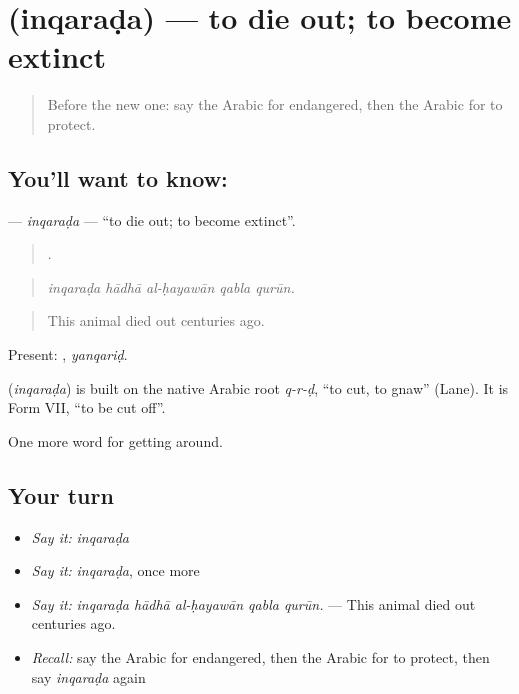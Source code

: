 \section[\texorpdfstring{\ar{انقرض} (inqaraḍa)}{انقرض (inqaraḍa)}]{ (inqaraḍa) — to die out; to become extinct}

\label{lesson:AR-C467-inqarada}



\begin{quote}
Before the new one: say the Arabic for endangered, then the Arabic for to protect.
\end{quote}

\subsection*{You'll want to know: }
\textbf{} — \emph{inqaraḍa} — \textquotedblleft{}to die out; to become extinct\textquotedblright{}.

\begin{quote}
    .
\end{quote}

\begin{quote}
\emph{inqaraḍa hādhā al-ḥayawān qabla qurūn.}
\end{quote}

\begin{quote}
This animal died out centuries ago.
\end{quote}

Present: , \emph{yanqariḍ}.

\begin{cousinweb}
\textbf{} (\emph{inqaraḍa}) is built on the native Arabic root \emph{q-r-ḍ}, \textquotedblleft{}to cut, to gnaw\textquotedblright{} (Lane). It is Form VII, \textquotedblleft{}to be cut off\textquotedblright{}.
\end{cousinweb}

\begin{grammarlens}[title={What you've built}]
One more word for getting around.
\end{grammarlens}

\subsection*{Your turn}
\begin{itemize}
\raggedright
  \item \emph{Say it:} \emph{inqaraḍa}
  \item \emph{Say it:} \emph{inqaraḍa}, once more
  \item \emph{Say it:} \emph{inqaraḍa hādhā al-ḥayawān qabla qurūn.} — This animal died out centuries ago.
  \item \emph{Recall:} say the Arabic for endangered, then the Arabic for to protect, then say \emph{inqaraḍa} again
\end{itemize}

